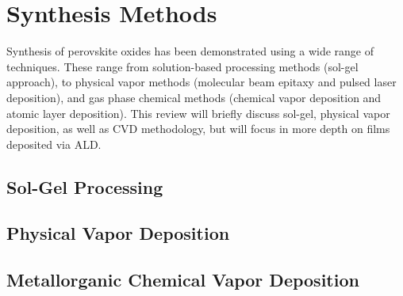\chapter{Synthesis Methods}
\label{chap:Synth}
\thispagestyle{empty}


Synthesis of perovskite oxides has been demonstrated using a wide range of techniques. These range from solution-based processing methods (sol-gel approach), to physical vapor methods (molecular beam epitaxy and pulsed laser deposition), and gas phase chemical methods (chemical vapor deposition and atomic layer deposition). This review will briefly discuss sol-gel, physical vapor deposition, as well as CVD methodology, but will focus in more depth on films deposited via ALD. 


\section{Sol-Gel Processing}
\label{sec:Synth-SolGel}

\lipsum


\section{Physical Vapor Deposition}
\label{sec:Synth-PVD}

\lipsum


\section{Metallorganic Chemical Vapor Deposition}
\label{sec:Synth-MOCVD}

\lipsum


